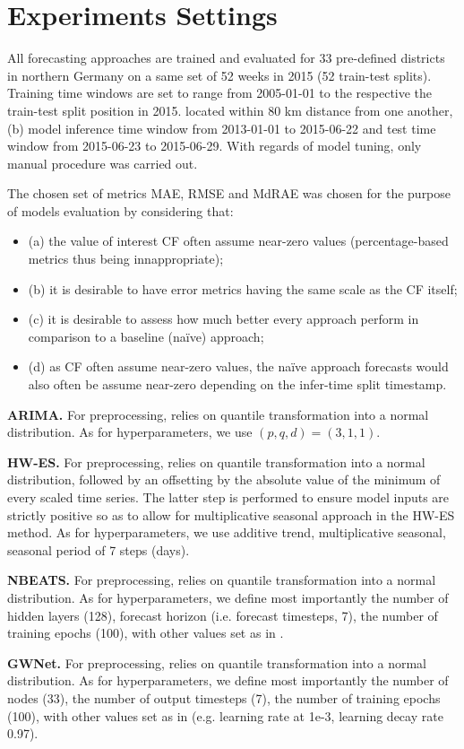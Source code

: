 \chapter{Experiments Settings}\label{chap:experiments}
All forecasting approaches are trained and evaluated for 33 pre-defined districts in northern Germany on a same set of 52 weeks in 2015 (52 train-test splits).
Training time windows are set to range from 2005-01-01 to the respective the train-test split position in 2015.
located within 80 km distance from one another, (b) model inference time window from 2013-01-01 to 2015-06-22 and test time window from 2015-06-23 to 2015-06-29.
With regards of model tuning, only manual procedure was carried out.

The chosen set of metrics MAE, RMSE and MdRAE was chosen for the purpose of models evaluation by considering that:
\begin{itemize}
    \item (a) the value of interest CF often assume near-zero values (percentage-based metrics thus being innappropriate);
    \item (b) it is desirable to have error metrics having the same scale as the CF itself;
    \item (c) it is desirable to assess how much better every approach perform in comparison to a baseline (naïve) approach;
    \item (d) as CF often assume near-zero values, the naïve approach forecasts would also often be assume near-zero depending on the infer-time split timestamp.
\end{itemize}

\vspace{1em}
\noindent
\textbf{ARIMA.} For preprocessing, relies on quantile transformation into a normal distribution.
As for hyperparameters, we use $(p,q,d) = (3,1,1)$.

\vspace{1em}
\noindent
\textbf{HW-ES.} For preprocessing, relies on quantile transformation into a normal distribution, followed by an offsetting by the absolute value of the minimum of every scaled time series.
The latter step is performed to ensure model inputs are strictly positive so as to allow for multiplicative seasonal approach in the HW-ES method.
As for hyperparameters, we use additive trend, multiplicative seasonal, seasonal period of 7 steps (days).

\vspace{1em}
\noindent
\textbf{NBEATS.} For preprocessing, relies on quantile transformation into a normal distribution.
As for hyperparameters, we define most importantly the number of hidden layers (128), forecast horizon (i.e. forecast timesteps, 7), the number of training epochs (100), with other values set as in \cite{Oreshkin2019a}.

\vspace{1em}
\noindent
\textbf{GWNet.} For preprocessing, relies on quantile transformation into a normal distribution.
As for hyperparameters, we define most importantly the number of nodes (33), the number of output timesteps (7), the number of training epochs (100), with other values set as in \cite{wu2019graphwavenet} (e.g. learning rate at 1e-3, learning decay rate 0.97).
